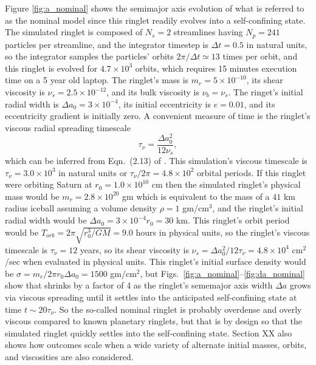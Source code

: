 \documentclass[preprint]{aastex62}
\begin{document}
Figure \ref{fig:a_nominal} shows the semimajor axis evolution of what is referred to
as the nominal model since this ringlet readily evolves into a self-confining state.
The simulated ringlet is composed of $N_s=2$ streamlines having $N_p=241$ particles
per streamline, and the integrator timestep is $\Delta t=0.5$ in natural units, so
the integrator samples the particles' orbits $2\pi/\Delta t\simeq13$ times per orbit, and this
ringlet is evolved for $4.7\times10^3$ orbits, which requires 15 minutes execution time
on a 5 year old laptop. The ringlet's mass is
$m_r=5\times10^{-10}$, its shear viscosity is $\nu_s=2.5\times10^{-12}$, and its
bulk viscosity is $\nu_b=\nu_s$. The ringet's initial radial width is
$\Delta a_0 = 3\times10^{-4}$, its initial eccentricity is $e=0.01$, and its
eccentricity gradient is initially zero. A convenient measure of time is the ringlet's
viscous radial spreading timescale
\begin{equation}
\label{eqn:viscous-timesscale}
    \tau_\nu=\frac{\Delta a_0^2}{12\nu_s}, 
\end{equation}
which can be inferred from Eqn.\ (2.13) of \cite{P81}. 
This simulation's viscous timescale is $\tau_\nu=3.0\times10^3$ in natural units
or $\tau_\nu/2\pi=4.8\times10^2$ orbital periods. If this ringlet were orbiting Saturn
at $r_0=1.0\times10^{10}$ cm then the simulated ringlet's physical mass
would be $m_r=2.8\times10^{20}$ gm which is equivalent to the mass of a $41$ km radius iceball assuming
a volume density $\rho=1$ gm/cm$^3$, and the ringlet's initial radial width would be
$\Delta a_0 = 3\times10^{-4}r_0=30$ km. This ringlet's
orbit period would be $T_{orb}=2\pi\sqrt{r_0^3/GM}=9.0$ hours in physical units, so 
the ringlet's viscous timescale is $\tau_\nu=12$ years,
so its shear viscosity is $\nu_s=\Delta a_0^2/12\tau_\nu = 4.8\times10^4$ cm$^2$/sec
when evaluated in physical units. 
This ringlet's initial surface density would be $\sigma=m_r/2\pi r_0\Delta a_0=1500$ gm/cm$^2$, but
Figs.\ \ref{fig:a_nominal}--\ref{fig:da_nominal} show that shrinks by a factor of 4 as the 
ringlet's sememajor axis width $\Delta a$ grows via viscous spreading until it settles into
the anticipated self-confining state at time $t\sim20\tau_\nu$.
So the so-called nominal ringlet is probably overdense and overly viscous compared to known 
planetary ringlets,
but that is by design so that the simulated ringlet quickly settles into the self-confining state.
Section XX also shows how outcomes scale when a wide variety of alternate initial masses, orbits,
and viscosities are also considered.
\end{document}
